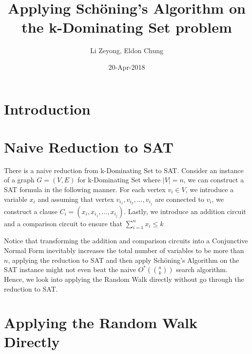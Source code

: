 \documentclass{article}
\title{Applying Sch\"{o}ning's Algorithm on the k-Dominating Set problem}
\author{Li Zeyong, Eldon Chung}
\date{20-Apr-2018}
\begin{document}
\maketitle

\section{Introduction}

\section{Naive Reduction to SAT}
There is a naive reduction from k-Dominating Set to SAT. Consider an instance of a graph $G = (V,E)$ for k-Dominating Set where $|V| = n$, we can construct a SAT formula in the following manner. For each vertex $v_i \in V$, we introduce a variable $x_i$ and assuming that vertex $v_{i_1}, v_{i_2},..., v_{i_j}$ are connected to $v_i$, we construct a clause $C_i = (x_i, x_{i_1}, ..., x_{i_j})$. Lastly, we introduce an addition circuit and a comparison circuit to ensure that $\sum_{i = 1}^n x_i 
\leq k$ \par
Notice that transforming the addition and comparison circuits into a Conjunctive Normal Form inevitably increases the total number of variables to be more than $n$, applying the reduction to SAT and then apply Sch\"{o}ning's Algorithm on the SAT instance might not even beat the naive $O^*({n \choose k})$ search algorithm. Hence, we look into applying the Random Walk directly without go through the reduction to SAT.

\section{Applying the Random Walk Directly}
\end{document}
